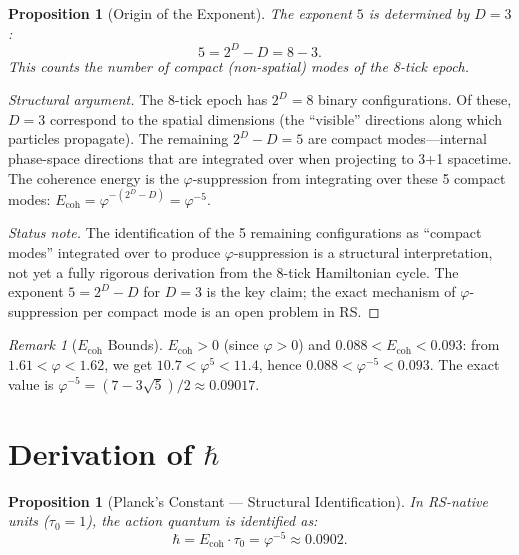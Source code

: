 \documentclass[12pt,a4paper]{article}
\newtheorem{proposition}[theorem]{Proposition}
\theoremstyle{definition}
\theoremstyle{remark}
\newtheorem{remark}[theorem]{Remark}
\begin{document}
\begin{proposition}[Origin of the Exponent]
\label{prop:exponent}
The exponent $5$ is determined by $D = 3$:
\begin{equation}
  5 = 2^D - D = 8 - 3.
\end{equation}
This counts the number of compact (non-spatial) modes of the
8-tick epoch.
\end{proposition}

\begin{proof}[Structural argument]
The 8-tick epoch has $2^D = 8$ binary configurations.  Of these,
$D = 3$ correspond to the spatial dimensions (the ``visible''
directions along which particles propagate).  The remaining
$2^D - D = 5$ are compact modes---internal phase-space directions
that are integrated over when projecting to 3+1 spacetime.  The
coherence energy is the $\varphi$-suppression from integrating
over these 5 compact modes:
$E_{\mathrm{coh}} = \varphi^{-(2^D - D)} = \varphi^{-5}$.

\emph{Status note.}  The identification of the 5 remaining
configurations as ``compact modes'' integrated over to produce
$\varphi$-suppression is a structural interpretation, not yet a
fully rigorous derivation from the 8-tick Hamiltonian cycle.
The exponent $5 = 2^D - D$ for $D = 3$ is the key claim; the
exact mechanism of $\varphi$-suppression per compact mode is an
open problem in RS.
\end{proof}

\begin{remark}[$E_{\mathrm{coh}}$ Bounds]
\label{thm:ecoh-bounds}
$E_{\mathrm{coh}} > 0$ (since $\varphi > 0$) and
$0.088 < E_{\mathrm{coh}} < 0.093$: from
$1.61 < \varphi < 1.62$, we get $10.7 < \varphi^5 < 11.4$,
hence $0.088 < \varphi^{-5} < 0.093$.
The exact value is $\varphi^{-5} = (7 - 3\sqrt{5})/2 \approx 0.09017$.
\end{remark}

\section{Derivation of $\hbar$}
\label{sec:derivation}

\begin{proposition}[Planck's Constant --- Structural Identification]
\label{thm:hbar}
In RS-native units ($\tau_0 = 1$), the action quantum is identified as:
\begin{equation}
  \boxed{\hbar = E_{\mathrm{coh}} \cdot \tau_0 = \varphi^{-5}
  \approx 0.0902.}
\end{equation}
\end{proposition}
\end{document}
